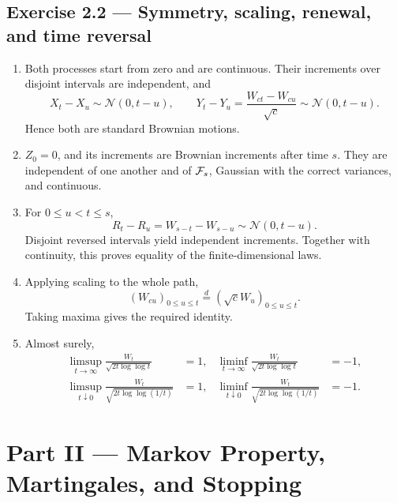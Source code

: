 \subsection*{Exercise 2.2 --- Symmetry, scaling, renewal, and time reversal}
\begin{enumerate}
  \item Both processes start from zero and are continuous. Their increments
  over disjoint intervals are independent, and
  \[
  X_t-X_u\sim\mathcal N(0,t-u),
  \qquad
  Y_t-Y_u=\frac{W_{ct}-W_{cu}}{\sqrt c}
  \sim\mathcal N(0,t-u).
  \]
  Hence both are standard Brownian motions.
  \item \(Z_0=0\), and its increments are Brownian increments after time
  \(s\). They are independent of one another and of \(\mathcal{F}_s\), Gaussian with
  the correct variances, and continuous.
  \item For \(0\leq u<t\leq s\),
  \[
  R_t-R_u=W_{s-t}-W_{s-u}\sim\mathcal N(0,t-u).
  \]
  Disjoint reversed intervals yield independent increments. Together with
  continuity, this proves equality of the finite-dimensional laws.
  \item Applying scaling to the whole path,
  \[
  (W_{cu})_{0\leq u\leq t}
  \overset{d}=(\sqrt c W_u)_{0\leq u\leq t}.
  \]
  Taking maxima gives the required identity.
  \item Almost surely,
  \[
  \begin{aligned}
  \limsup_{t\to\infty}\frac{W_t}{\sqrt{2t\log\log t}}&=1,
  &\liminf_{t\to\infty}\frac{W_t}{\sqrt{2t\log\log t}}&=-1,\\
  \limsup_{t\downarrow0}\frac{W_t}{\sqrt{2t\log\log(1/t)}}&=1,
  &\liminf_{t\downarrow0}\frac{W_t}{\sqrt{2t\log\log(1/t)}}&=-1.
  \end{aligned}
  \]
\end{enumerate}

\section*{Part II --- Markov Property, Martingales, and Stopping}

